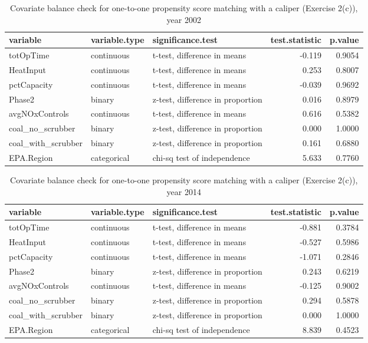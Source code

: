 \begin{enumerate}[(a)]
  \begin{table}[ht]
    \centering
    \begin{tabular}{lllrr}
      \toprule
      variable & variable.type & significance.test & test.statistic & p.value \\ 
      \midrule
      totOpTime & continuous & t-test, difference in means & -0.119 & 0.9054 \\ 
      HeatInput & continuous & t-test, difference in means & 0.253 & 0.8007 \\ 
      pctCapacity & continuous & t-test, difference in means & -0.039 & 0.9692 \\ 
      Phase2 & binary & z-test, difference in proportion & 0.016 & 0.8979 \\ 
      avgNOxControls & continuous & t-test, difference in means & 0.616 & 0.5382 \\ 
      coal\_no\_scrubber & binary & z-test, difference in proportion & 0.000 & 1.0000 \\ 
      coal\_with\_scrubber & binary & z-test, difference in proportion & 0.161 & 0.6880 \\ 
      EPA.Region & categorical & chi-sq test of independence & 5.633 & 0.7760 \\ 
      \bottomrule
    \end{tabular}
    \caption{Covariate balance check for one-to-one propensity score
      matching with a caliper (Exercise 2(c)), year 2002}
    \label{tab-bal2c-02}
  \end{table}

  \begin{table}[ht]
    \centering
    \begin{tabular}{lllrr}
      \toprule
      variable & variable.type & significance.test & test.statistic & p.value \\ 
      \midrule
      totOpTime & continuous & t-test, difference in means & -0.881 & 0.3784 \\ 
      HeatInput & continuous & t-test, difference in means & -0.527 & 0.5986 \\ 
      pctCapacity & continuous & t-test, difference in means & -1.071 & 0.2846 \\ 
      Phase2 & binary & z-test, difference in proportion & 0.243 & 0.6219 \\ 
      avgNOxControls & continuous & t-test, difference in means & -0.125 & 0.9002 \\ 
      coal\_no\_scrubber & binary & z-test, difference in proportion & 0.294 & 0.5878 \\ 
      coal\_with\_scrubber & binary & z-test, difference in proportion & 0.000 & 1.0000 \\ 
      EPA.Region & categorical & chi-sq test of independence & 8.839 & 0.4523 \\ 
      \bottomrule
    \end{tabular}
    \caption{Covariate balance check for one-to-one propensity score
      matching with a caliper (Exercise 2(c)), year 2014}
    \label{tab-bal2c-14}
  \end{table}


\end{enumerate}
